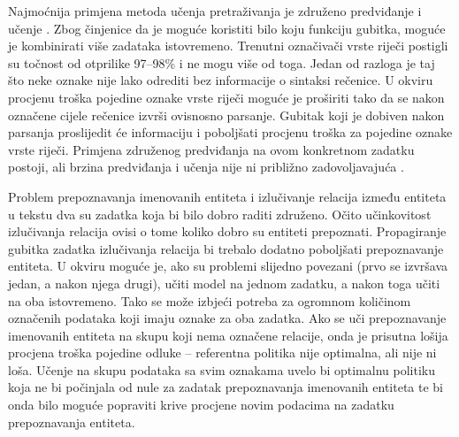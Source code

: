 Najmoćnija primjena metoda učenja pretraživanja je združeno predviđanje i učenje
. Zbog činjenice da je moguće koristiti bilo
koju funkciju gubitka, moguće je kombinirati više zadataka istovremeno. Trenutni
označivači vrste riječi postigli su točnost od otprilike 97--98\%
\citep{manning2011part} i ne mogu više od toga. Jedan od razloga je taj što neke
oznake nije lako odrediti bez informacije o sintaksi rečenice. U okviru \lts{}
procjenu troška pojedine oznake vrste riječi moguće je proširiti tako da se
nakon označene cijele rečenice izvrši ovisnosno parsanje. Gubitak koji je
dobiven nakon parsanja proslijedit će informaciju i poboljšati procjenu
troška za pojedine oznake vrste riječi. Primjena združenog predviđanja na ovom
konkretnom zadatku postoji, ali brzina predviđanja i učenja nije ni približno
zadovoljavajuća \citep{bohnet2012transition}.

Problem prepoznavanja imenovanih entiteta i izlučivanje relacija između entiteta
u tekstu dva su zadatka koja bi bilo dobro raditi združeno. Očito učinkovitost
izlučivanja relacija ovisi o tome koliko dobro su entiteti prepoznati.
Propagiranje gubitka zadatka izlučivanja relacija bi trebalo dodatno poboljšati
prepoznavanje entiteta. U okviru \lts{} moguće je, ako su problemi slijedno
povezani (prvo se izvršava jedan, a nakon njega drugi), učiti model na jednom
zadatku, a nakon toga učiti na oba istovremeno. Tako se može izbjeći potreba za
ogromnom količinom označenih podataka koji imaju oznake za oba zadatka. Ako se
uči prepoznavanje imenovanih entiteta na skupu koji nema označene relacije, onda
je prisutna lošija procjena troška pojedine odluke -- referentna politika nije
optimalna, ali nije ni loša. Učenje na skupu podataka sa svim oznakama uvelo bi
optimalnu politiku koja ne bi počinjala od nule za zadatak prepoznavanja
imenovanih entiteta te bi onda bilo moguće popraviti krive procjene novim
podacima na zadatku prepoznavanja entiteta.

